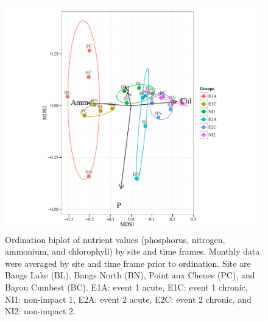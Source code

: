 \documentclass[letterpaper,12pt]{article}\usepackage[]{graphicx}\usepackage[]{color}
\makeatletter
\def\maxwidth{ %
  \ifdim\Gin@nat@width>\linewidth
    \linewidth
  \else
    \Gin@nat@width
  \fi
}
\makeatother
\begin{document}
\begin{figure}[!ht]

{\centering \includegraphics[width=\maxwidth]{figs/ordfig-1} 

}

\caption[Ordination biplot of nutrient values (phosphorus, nitrogen, ammonium, and chlorophyll) by site and time frames]{Ordination biplot of nutrient values (phosphorus, nitrogen, ammonium, and chlorophyll) by site and time frames. Monthly data were averaged by site and time frame prior to ordination.  Site are Bangs Lake (BL), Bangs North (BN), Point aux Chenes (PC), and Bayou Cumbest (BC). E1A: event 1 acute, E1C: event 1 chronic, NI1: non-impact 1, E2A: event 2 acute, E2C: event 2 chronic, and NI2: non-impact 2.}\label{fig:ordfig}
\end{figure}


\clearpage
\end{document}
